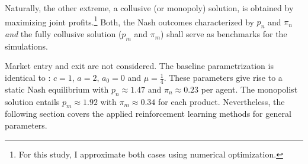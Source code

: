 Naturally, the other extreme, a collusive (or monopoly) solution, is obtained by maximizing joint profits.\footnote{For this study, I approximate both cases using numerical optimization.} Both, the Nash outcomes characterized by $p_n$ and $\pi_n$ \emph{and} the fully collusive solution ($p_m$ and $\pi_m$) shall serve as benchmarks for the simulations.

Market entry and exit are not considered. The baseline parametrization is identical to \textcite{calvano_artificial_2019}:
$c = 1$,
$a = 2$,
$a_0 = 0$ and
$\mu = \frac{1}{4}$. These parameters give rise to a static Nash equilibrium with $p_n \approx 1.47$ and $\pi_n \approx 0.23$ per agent. The monopolist solution entails $p_m \approx 1.92$ with $\pi_m \approx 0.34$ for each product. Nevertheless, the following section covers the applied reinforcement learning methods for general parameters.
